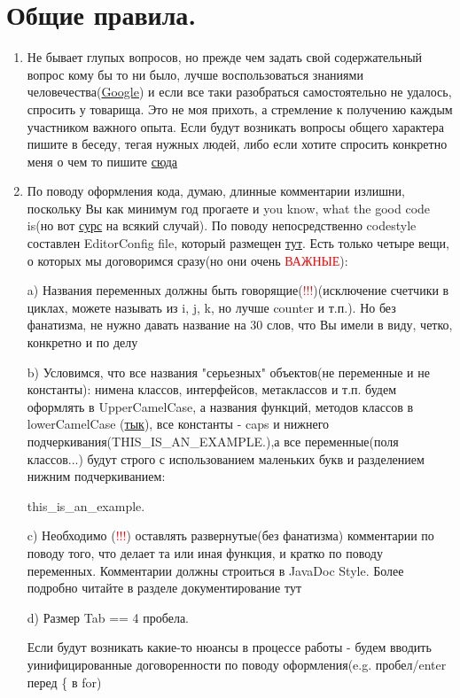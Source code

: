 \documentclass{article}
\begin{document}
\section{Общие правила.}
\begin{enumerate}
    \item Не бывает глупых вопросов, но прежде чем задать свой содержательный вопрос кому бы то ни было, лучше воспользоваться знаниями человечества(\href{https://google.com/}{Google}) и если все таки разобраться самостоятельно не удалось, спросить у товарища. Это не моя прихоть, а стремление к получению каждым участником важного опыта. Если будут возникать вопросы общего характера пишите в беседу, тегая нужных людей, либо если хотите спросить конкретно меня о чем то пишите \href{https://t.me/IvanBazalii}{сюда}
    \item По поводу оформления кода, думаю, длинные комментарии излишни, поскольку Вы как минимум год прогаете и you know, what the good code is(но вот \href{http://neerc.ifmo.ru/teaching/disalgo/cppcodestyle.pdf}{сурс} на всякий случай). По поводу непосредственно codestyle составлен EditorConfig file, который размещен \href{}{тут}. Есть только четыре вещи, о которых мы договоримся сразу(но они очень \textcolor{red}{ВАЖНЫЕ}): 
    
    a) Названия переменных должны быть говорящие(\textcolor{red}{!!!})(исключение счетчики в циклах, можете называть из i, j, k, но лучше counter и т.п.). Но без фанатизма, не нужно давать название на 30 слов, что Вы имели в виду, четко, конкретно и по делу
    
    b) Условимся, что все названия "серьезных" объектов(не переменные и не константы):  нимена классов, интерфейсов, метаклассов и т.п. будем оформлять в UpperCamelCase, а названия функций, методов классов в lowerCamelCase (\href{https://ru.wikipedia.org/wiki/CamelCase}{тык}), все константы - caps и нижнего подчеркивания(THIS\_IS\_AN\_EXAMPLE.),а все переменные(поля классов...) будут строго с использованием маленьких букв и разделением нижним подчеркиванием: 
    
    this\_is\_an\_example.
    
    c) Необходимо (\textcolor{red}{!!!}) оставлять развернутые(без фанатизма) комментарии по поводу того, что делает та или иная функция, и кратко по поводу переменных. Комментарии должны строиться в JavaDoc Style. Более подробно читайте в разделе документирование тут
    
    d) Размер Tab == 4 пробела.
    
    Если будут возникать какие-то нюансы в процессе работы - будем вводить уинифицированные договоренности по поводу оформления(e.g. пробел/enter перед \{ в for)
    

\end{enumerate}
\end{document}
